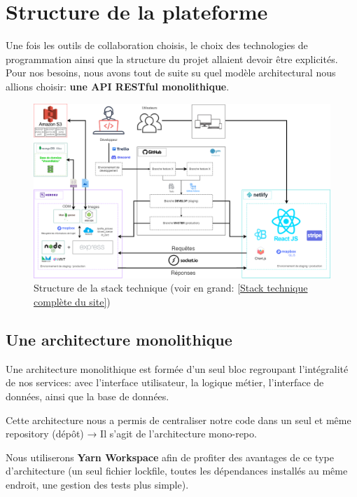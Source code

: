 \section{Structure de la plateforme}

Une fois les outils de collaboration choisis, le choix des technologies de programmation ainsi que la structure du projet allaient devoir être explicités. Pour nos besoins, nous avons tout de suite su quel modèle architectural nous allions choisir: \textbf{une API RESTful monolithique}.\\

\begin{figure}[th]
\centering
\includegraphics[width=\linewidth]{medias/stack-structure.png}
\decoRule
\caption{Structure de la stack technique (voir en grand: \ref{Stack technique complète du site})}
\end{figure}

\subsection{Une architecture monolithique}

Une architecture monolithique est formée d'un seul bloc regroupant l'intégralité de nos services: avec l'interface utilisateur, la logique métier, l'interface de données, ainsi que la base de données.

Cette architecture nous a permis de centraliser notre code dans un seul et même repository (dépôt) → Il s'agit de l'architecture mono-repo\parencite{Ref1}. 

Nous utiliserons \textbf{Yarn Workspace} afin de profiter des avantages de ce type d'architecture (un seul fichier lockfile, toutes les dépendances installés au même endroit, une gestion des tests plus simple).

